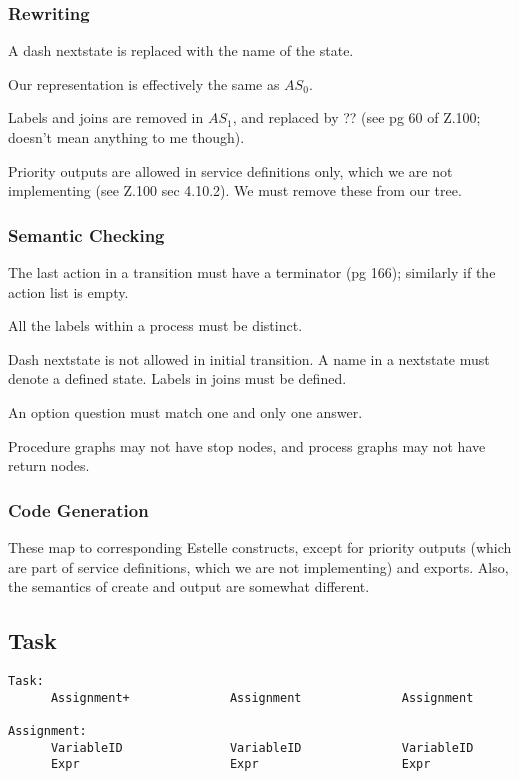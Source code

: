 \subsubsection{Rewriting}

A dash nextstate is replaced with the name of the state.

Our representation is effectively the same as $AS_0$.

Labels and joins are removed in $AS_1$, and replaced by ??
(see pg 60 of Z.100; doesn't mean anything to me though).

Priority outputs are allowed in service definitions only,
which we are not implementing (see Z.100 sec 4.10.2).
We must remove these from our tree.

\subsubsection{Semantic Checking}

The last action in a transition must have a terminator (pg
166); similarly if the action list is empty.

All the labels within a process must be distinct.

Dash nextstate is not allowed in initial transition.
A name in a nextstate must denote a defined state.
Labels in joins must be defined.

An option question must match one and only one answer.

Procedure graphs may not have stop nodes, and process graphs may not
have return nodes.

\subsubsection{Code Generation}

These map to corresponding Estelle constructs, except for priority
outputs (which are part of service definitions, which we are
not implementing) and exports. 
Also, the semantics of create and output are
somewhat different.

\subsection{Task}

\begin{verbatim}
Task:
      Assignment+              Assignment              Assignment

Assignment:
      VariableID               VariableID              VariableID
      Expr                     Expr                    Expr
\end{verbatim}

